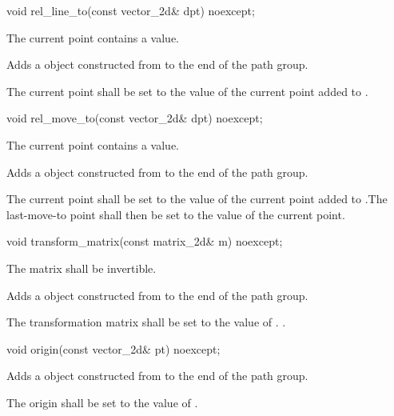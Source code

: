\begin{itemdecl}
    void rel_line_to(const vector_2d& dpt) noexcept;
\end{itemdecl}
\begin{itemdescr}
	\pnum
	\requires
	The current point contains a value.
	
	\pnum
	\effects
	Adds a  object constructed from  to the end of the path group.
	
	\pnum
	The current point shall be set to the value of the current point added to .
\end{itemdescr}

\begin{itemdecl}
    void rel_move_to(const vector_2d& dpt) noexcept;
\end{itemdecl}
\begin{itemdescr}
	\pnum
	\requires
	The current point contains a value.
	
	\pnum
	\effects
	Adds a  object constructed from  to the end of the path group.
	
	\pnum
	The current point shall be set to the value of the current point added to .The last-move-to point shall then be set to the value of the current point.
\end{itemdescr}

\begin{itemdecl}
    void transform_matrix(const matrix_2d& m) noexcept;
\end{itemdecl}
\begin{itemdescr}
	\pnum
	\requires
	The matrix  shall be invertible.
	
	\pnum
	\effects
	Adds a  object constructed from  to the end of the path group.
	
	\pnum
	The transformation matrix shall be set to the value of .
	.
\end{itemdescr}

\begin{itemdecl}
    void origin(const vector_2d& pt) noexcept;
\end{itemdecl}
\begin{itemdescr}
	\pnum
	\effects
	Adds a  object constructed from  to the end of the path group.
	
	\pnum
	The origin shall be set to the value of .
\end{itemdescr}

